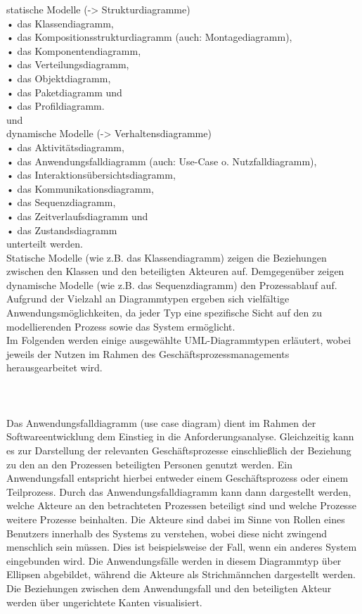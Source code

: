  statische Modelle (-> Strukturdiagramme)\\
• das Klassendiagramm,\\
• das Kompositionsstrukturdiagramm (auch: Montagediagramm),\\
• das Komponentendiagramm,\\
• das Verteilungsdiagramm,\\
• das Objektdiagramm,\\
• das Paketdiagramm und\\
• das Profildiagramm.\\
und\\
 dynamische Modelle (-> Verhaltensdiagramme)\\
• das Aktivitätsdiagramm,\\
• das Anwendungsfalldiagramm (auch: Use-Case o. Nutzfalldiagramm),\\
• das Interaktionsübersichtsdiagramm,\\
• das Kommunikationsdiagramm,\\
• das Sequenzdiagramm,\\
• das Zeitverlaufsdiagramm und\\
• das Zustandsdiagramm\\
unterteilt werden.\\
Statische Modelle (wie z.B. das Klassendiagramm) zeigen die Beziehungen zwischen den Klassen und den beteiligten Akteuren auf. Demgegenüber zeigen dynamische Modelle (wie z.B. das Sequenzdiagramm) den Prozessablauf auf. Aufgrund der Vielzahl an Diagrammtypen ergeben sich vielfältige Anwendungsmöglichkeiten, da jeder Typ eine spezifische Sicht auf den zu modellierenden Prozess sowie das System ermöglicht.\\
Im Folgenden werden einige ausgewählte UML-Diagrammtypen erläutert, wobei jeweils der Nutzen im Rahmen des Geschäftsprozessmanagements herausgearbeitet wird.\\
\\
\\
\\
Das Anwendungsfalldiagramm (use case diagram) dient im Rahmen der Softwareentwicklung dem Einstieg in die Anforderungsanalyse. Gleichzeitig kann es zur Darstellung der relevanten Geschäftsprozesse einschließlich der Beziehung zu den an den Prozessen beteiligten Personen genutzt werden. Ein Anwendungsfall entspricht hierbei entweder einem Geschäftsprozess oder einem Teilprozess. Durch das Anwendungsfalldiagramm kann dann dargestellt werden, welche Akteure an den betrachteten Prozessen beteiligt sind und welche Prozesse weitere Prozesse beinhalten. Die Akteure sind dabei im Sinne von Rollen eines Benutzers innerhalb des Systems zu verstehen, wobei diese nicht zwingend menschlich sein müssen. Dies ist beispielsweise der Fall, wenn ein anderes System eingebunden wird. Die Anwendungsfälle werden in diesem Diagrammtyp über Ellipsen abgebildet, während die Akteure als Strichmännchen dargestellt werden. Die Beziehungen zwischen dem Anwendungsfall und den beteiligten Akteur werden über ungerichtete Kanten visualisiert.\\

